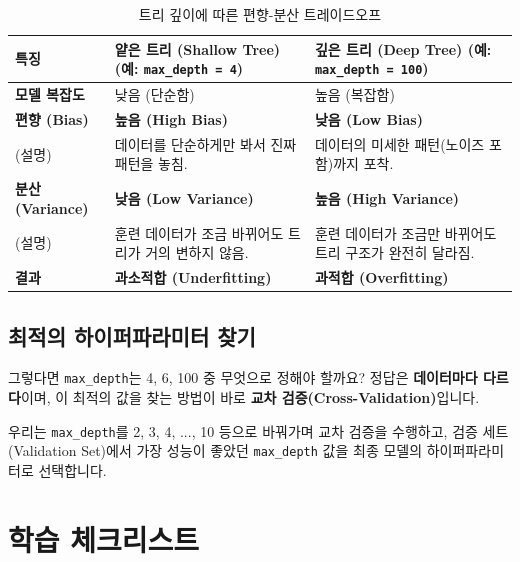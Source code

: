 \documentclass[11pt,a4paper]{book}
\theoremstyle{definition}
\begin{document}
\begin{table}[h!]
    \centering
    \caption{트리 깊이에 따른 편향-분산 트레이드오프}
    \label{tab:bias_variance}
    \begin{tabular}{lll}
        \toprule
        특징 & \textbf{얕은 트리 (Shallow Tree)} (예: \texttt{max\_depth = 4}) & \textbf{깊은 트리 (Deep Tree)} (예: \texttt{max\_depth = 100}) \\
        \midrule
        \textbf{모델 복잡도} & 낮음 (단순함) & 높음 (복잡함) \\
        \textbf{편향 (Bias)} & \textbf{높음 (High Bias)} & \textbf{낮음 (Low Bias)} \\
        (설명) & 데이터를 단순하게만 봐서 진짜 패턴을 놓침. & 데이터의 미세한 패턴(노이즈 포함)까지 포착. \\
        \textbf{분산 (Variance)} & \textbf{낮음 (Low Variance)} & \textbf{높음 (High Variance)} \\
        (설명) & 훈련 데이터가 조금 바뀌어도 트리가 거의 변하지 않음. & 훈련 데이터가 조금만 바뀌어도 트리 구조가 완전히 달라짐. \\
        \textbf{결과} & \textbf{과소적합 (Underfitting)} & \textbf{과적합 (Overfitting)} \\
        \bottomrule
    \end{tabular}
\end{table}

\subsection{최적의 하이퍼파라미터 찾기}
그렇다면 \texttt{max\_depth}는 4, 6, 100 중 무엇으로 정해야 할까요?
정답은 \textbf{데이터마다 다르다}이며, 이 최적의 값을 찾는 방법이 바로 \textbf{교차 검증(Cross-Validation)}입니다.

우리는 \texttt{max\_depth}를 2, 3, 4, ..., 10 등으로 바꿔가며 교차 검증을 수행하고, 검증 세트(Validation Set)에서 가장 성능이 좋았던 \texttt{max\_depth} 값을 최종 모델의 하이퍼파라미터로 선택합니다.


\section{학습 체크리스트}
\end{document}
